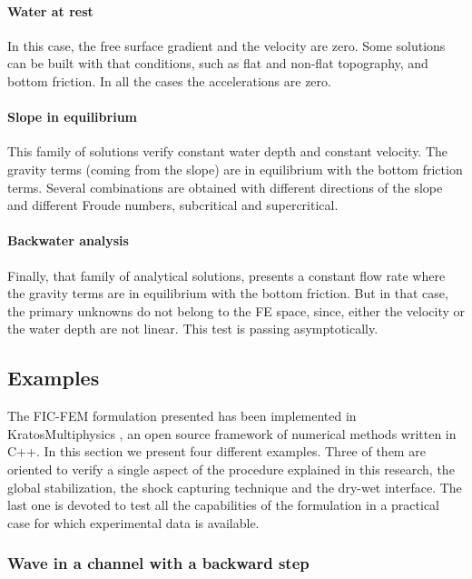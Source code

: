 \paragraph{Water at rest}
In this case, the free surface gradient and the velocity are zero. Some solutions can be built with that conditions, such as flat and non-flat topography, and bottom friction. In all the cases the accelerations are zero.

\paragraph{Slope in equilibrium}
This family of solutions verify constant water depth and constant velocity. The gravity terms (coming from the slope) are in equilibrium with the bottom friction terms. Several combinations are obtained with different directions of the slope and different Froude numbers, subcritical and supercritical.

\paragraph{Backwater analysis}
Finally, that family of analytical solutions, presents a constant flow rate where the gravity terms are in equilibrium with the bottom friction. But in that case, the primary unknowns do not belong to the FE space, since, either the velocity or the water depth are not linear. This test is passing asymptotically.


\subsection{Examples}
\label{sec:examples}

The FIC-FEM formulation presented has been implemented in KratosMultiphysics \cite{dadvand2010, dadvand2013}, an open source framework of numerical methods written in C++.
In this section we present four different examples. Three of them are oriented to verify a single aspect of the procedure explained in this research, the global stabilization, the shock capturing technique and the dry-wet interface.
The last one is devoted to test all the capabilities of the formulation in a practical case for which experimental data is available.


\subsubsection{Wave in a channel with a backward step}

